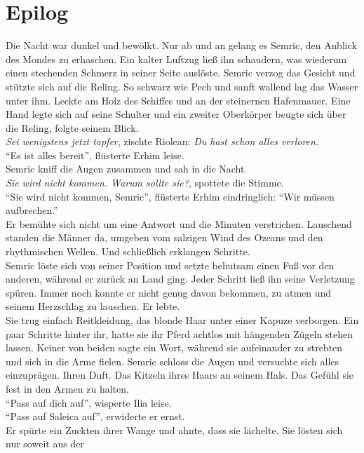 \chapter{Epilog}

Die Nacht war dunkel und bewölkt. Nur ab und an gelang es Semric, den Anblick des Mondes zu 
erhaschen. Ein kalter Luftzug ließ ihn schaudern, was wiederum einen stechenden Schmerz in seiner 
Seite auslöste. Semric verzog das Gesicht und stützte sich auf die Reling. So schwarz wie Pech und 
sanft wallend lag das Wasser unter ihm. Leckte am Holz des Schiffes und an der steinernen 
Hafenmauer. Eine Hand legte sich auf seine Schulter und ein zweiter Oberkörper beugte sich über die 
Reling, folgte seinem Blick.\\
\textit{Sei wenigstens jetzt tapfer}, zischte Riolean: \textit{Du hast schon alles verloren.}\\
``Es ist alles bereit'', flüsterte Erhim leise.\\
Semric kniff die Augen zusammen und sah in die Nacht.\\
\textit{Sie wird nicht kommen. Warum sollte sie?}, spottete die Stimme.\\
``Sie wird nicht kommen, Semric'', flüsterte Erhim eindringlich: ``Wir müssen aufbrechen.''\\
Er bemühte sich nicht um eine Antwort und die Minuten verstrichen. Lauschend standen die Männer da, 
umgeben vom salzigen Wind des Ozeans und den rhythmischen Wellen. Und schließlich erklangen 
Schritte.\\
Semric löste sich von seiner Position und setzte behutsam einen Fuß vor den anderen, während er 
zurück an Land ging. Jeder Schritt ließ ihn seine Verletzung spüren. Immer noch konnte er nicht 
genug davon bekommen, zu atmen und seinem Herzschlag zu lauschen. Er lebte.\\
Sie trug einfach Reitkleidung, das blonde Haar unter einer Kapuze verborgen. Ein paar Schritte 
hinter ihr, hatte sie ihr Pferd achtlos mit hängenden Zügeln stehen lassen. Keiner von beiden sagte 
ein Wort, während sie aufeinander zu strebten und sich in die Arme fielen. Semric schloss die Augen 
und versuchte sich alles einzuprägen. Ihren Duft. Das Kitzeln ihres Haars an seinem Hals. Das 
Gefühl sie fest in den Armen zu halten.\\
``Pass auf dich auf'', wisperte Ilia leise.\\
``Pass auf Saleica auf'', erwiderte er ernst.\\
Er spürte ein Zuckten ihrer Wange und ahnte, dass sie lächelte. Sie lösten sich nur soweit aus der 
